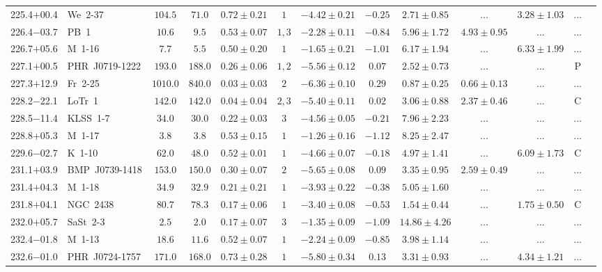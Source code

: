 \documentclass[useAMS]{mn2e}
\begin{document}
\begin{center}
{\begin{longtable}{llccccccccccc}
225.4$+$00.4&We~2-37&$     104.5$&$      71.0$&$0.72 \pm 0.21$&$1$&$-4.42 \pm 0.21$&$     -0.25$&$2.71 \pm 0.85$&$...$&$3.28 \pm 1.03$&...\\
226.4$-$03.7&PB~1&$      10.6$&$       9.5$&$0.53 \pm 0.07$&$1,3$&$-2.28 \pm 0.11$&$     -0.84$&$5.96 \pm 1.72$&$4.93 \pm 0.95$&$...$&...\\
226.7$+$05.6&M~1-16&$       7.7$&$       5.5$&$0.50 \pm 0.20$&$1$&$-1.65 \pm 0.21$&$     -1.01$&$6.17 \pm 1.94$&$...$&$6.33 \pm 1.99$&...\\
227.1$+$00.5&PHR~J0719-1222&$     193.0$&$     188.0$&$0.26 \pm 0.06$&$1,2$&$-5.56 \pm 0.12$&$      0.07$&$2.52 \pm 0.73$&$...$&$...$&P\\
227.3$+$12.9&Fr~2-25&$    1010.0$&$     840.0$&$0.03 \pm 0.03$&$2$&$-6.36 \pm 0.10$&$      0.29$&$0.87 \pm 0.25$&$0.66 \pm 0.13$&$...$&...\\
228.2$-$22.1&LoTr~1&$     142.0$&$     142.0$&$0.04 \pm 0.04$&$2,3$&$-5.40 \pm 0.11$&$      0.02$&$3.06 \pm 0.88$&$2.37 \pm 0.46$&$...$&C\\
228.5$-$11.4&KLSS~1-7&$      34.0$&$      30.0$&$0.22 \pm 0.03$&$3$&$-4.56 \pm 0.05$&$     -0.21$&$7.96 \pm 2.23$&$...$&$...$&...\\
228.8$+$05.3&M~1-17&$       3.8$&$       3.8$&$0.53 \pm 0.15$&$1$&$-1.26 \pm 0.16$&$     -1.12$&$8.25 \pm 2.47$&$...$&$...$&...\\
229.6$-$02.7&K~1-10&$      62.0$&$      48.0$&$0.52 \pm 0.01$&$1$&$-4.66 \pm 0.07$&$     -0.18$&$4.97 \pm 1.41$&$...$&$6.09 \pm 1.73$&C\\
231.1$+$03.9&BMP~J0739-1418&$     153.0$&$     150.0$&$0.30 \pm 0.07$&$2$&$-5.65 \pm 0.08$&$      0.09$&$3.35 \pm 0.95$&$2.59 \pm 0.49$&$...$&...\\
231.4$+$04.3&M~1-18&$      34.9$&$      32.9$&$0.21 \pm 0.21$&$1$&$-3.93 \pm 0.22$&$     -0.38$&$5.05 \pm 1.60$&$...$&$...$&...\\
231.8$+$04.1&NGC~2438&$      80.7$&$      78.3$&$0.17 \pm 0.06$&$1$&$-3.40 \pm 0.08$&$     -0.53$&$1.54 \pm 0.44$&$...$&$1.75 \pm 0.50$&C\\
232.0$+$05.7&SaSt~2-3&$       2.5$&$       2.0$&$0.17 \pm 0.07$&$3$&$-1.35 \pm 0.09$&$     -1.09$&$14.86 \pm 4.26$&$...$&$...$&...\\
232.4$-$01.8&M~1-13&$      18.6$&$      11.6$&$0.52 \pm 0.07$&$1$&$-2.24 \pm 0.09$&$     -0.85$&$3.98 \pm 1.14$&$...$&$...$&...\\
232.6$-$01.0&PHR~J0724-1757&$     171.0$&$     168.0$&$0.73 \pm 0.28$&$1$&$-5.80 \pm 0.34$&$      0.13$&$3.31 \pm 0.93$&$...$&$4.34 \pm 1.21$&...\\

\end{longtable}}
\end{center}
\end{document}
